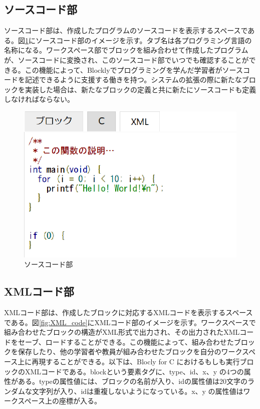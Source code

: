 \documentclass{risepaper}
\begin{document}
   \subsection{ソースコード部}
   
ソースコード部は、作成したプログラムのソースコードを表示するスペースである。図\ref{fig:source_code}にソースコード部のイメージを示す。タブ名は各プログラミング言語の名称になる。ワークスペース部でブロックを組み合わせて作成したプログラムが、ソースコードに変換され、このソースコード部でいつでも確認することができる。この機能によって、Blocklyでプログラミングを学んだ学習者がソースコードを記述できるように支援する働きを持つ。システムの拡張の際に新たなブロックを実装した場合は、新たなブロックの定義と共に新たにソースコードも定義しなければならない。

\begin{figure}[h]
\begin{center}
\includegraphics[scale=0.5]{img/source_code.eps}
\caption{ソースコード部}%
\label{fig:source_code}
\end{center}%
\end{figure}%

   \subsection{XMLコード部}
   
XMLコード部は、作成したブロックに対応するXMLコードを表示するスペースである。図\ref{fig:XML_code}にXMLコード部のイメージを示す。ワークスペースで組み合わせたブロックの構造がXML形式で出力され、その出力されたXMLコードをセーブ、ロードすることができる。この機能によって、組み合わせたブロックを保存したり、他の学習者や教員が組み合わせたブロックを自分のワークスペース上に再現することができる。以下は、Blocly for C におけるもしも実行ブロックのXMLコードである。blockという要素タグに、type、id、x、y の4つの属性がある。typeの属性値には、ブロックの名前が入り、idの属性値は20文字のランダムな文字列が入り、idは重複しないようになっている。x、y の属性値はワークスペース上の座標が入る。
\end{document}
